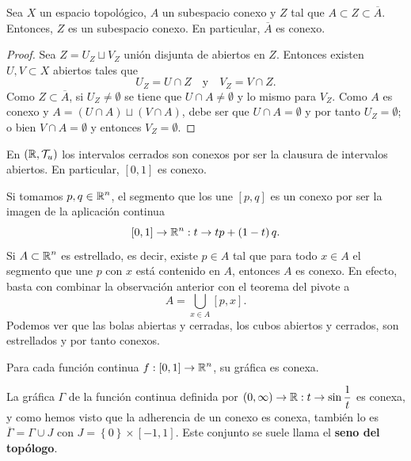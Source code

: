 \begin{prop}
	Sea $\displaystyle X $ un espacio topológico, $\displaystyle A $ un subespacio conexo y $\displaystyle Z $ tal que $\displaystyle A \subset Z \subset \overline{A} $. Entonces, $\displaystyle Z $ es un subespacio conexo. En particular, $\displaystyle \overline{A} $ es conexo.
\end{prop}
\begin{proof}
Sea $\displaystyle Z = U_{Z}\sqcup V_{Z} $ unión disjunta de abiertos en $\displaystyle Z $. Entonces existen $\displaystyle U,V\subset X $ abiertos tales que 
\[U_{Z}= U\cap Z \quad \text{y} \quad V_{Z}= V \cap Z .\]
Como $\displaystyle Z\subset \overline{A} $, si $\displaystyle U_{Z}\neq \emptyset $ se tiene que $\displaystyle U \cap A \neq \emptyset $ y lo mismo para $\displaystyle V_{Z} $. 
Como $\displaystyle A $ es conexo y $\displaystyle A = \left(U \cap A\right)\sqcup\left(V \cap A\right) $, debe ser que $\displaystyle U \cap A = \emptyset $ y por tanto $\displaystyle U_{Z}= \emptyset $; o bien $\displaystyle V \cap A = \emptyset $ y entonces $\displaystyle V_{Z}= \emptyset $.
\end{proof}
\begin{eg}
	En $\displaystyle \left(\mathbb{R}, \mathcal{T}_{u}\right) $ los intervalos cerrados son conexos por ser la clausura de intervalos abiertos. En particular, $\displaystyle \left[0,1\right]  $ es conexo.
\end{eg}
\begin{eg}
	Si tomamos $\displaystyle p,q\in \mathbb{R}^{n} $, el segmento que los une $\displaystyle \left[p,q\right]  $ es un conexo por ser la imagen de la aplicación continua
	\[ \left[0,1\right] \to \mathbb{R}^{n} : t \to tp + \left(1-t\right)q .\]
	Si $\displaystyle A \subset \mathbb{R}^{n} $ es estrellado, es decir, existe $\displaystyle p \in A $ tal que para todo $\displaystyle x \in A $ el segmento que une $\displaystyle p $ con $\displaystyle x $ está contenido en $\displaystyle A $, entonces $\displaystyle A $ es conexo. En efecto, basta con combinar la observación anterior con el teorema del pivote a
	\[A = \bigcup_{x \in A}\left[p,x\right]  .\]
	Podemos ver que las bolas abiertas y cerradas, los cubos abiertos y cerrados, son estrellados y por tanto conexos. 
\end{eg}
\begin{eg}
	Para cada función continua $\displaystyle f : \left[0,1\right] \to \mathbb{R}^{n} $, su gráfica es conexa. 
\end{eg}
\begin{eg}
	La gráfica $\displaystyle \Gamma $ de la función continua definida por $\displaystyle \left(0, \infty\right) \to \mathbb{R} : t \to \sin \frac{1}{t} $ es conexa, y como hemos visto que la adherencia de un conexo es conexa, también lo es $\displaystyle \overline{\Gamma }=\Gamma \cup J $ con $\displaystyle J = \left\{ 0\right\} \times \left[-1,1\right]  $. Este conjunto se suele llama el \textbf{seno del topólogo}. 
\end{eg}
